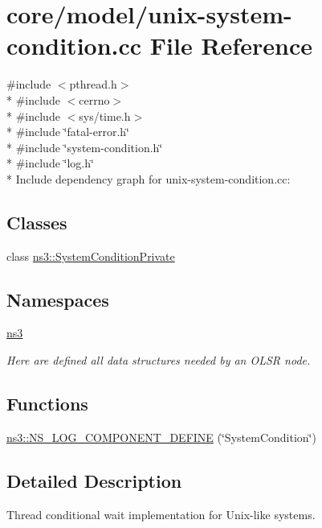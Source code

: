 \hypertarget{unix-system-condition_8cc}{}\section{core/model/unix-\/system-\/condition.cc File Reference}
\label{unix-system-condition_8cc}
{\ttfamily \#include $<$pthread.\+h$>$}\\*
{\ttfamily \#include $<$cerrno$>$}\\*
{\ttfamily \#include $<$sys/time.\+h$>$}\\*
{\ttfamily \#include \char`\"{}fatal-\/error.\+h\char`\"{}}\\*
{\ttfamily \#include \char`\"{}system-\/condition.\+h\char`\"{}}\\*
{\ttfamily \#include \char`\"{}log.\+h\char`\"{}}\\*
Include dependency graph for unix-\/system-\/condition.cc\+:
\subsection*{Classes}
\begin{DoxyCompactItemize}
\item 
class \hyperlink{classns3_1_1SystemConditionPrivate}{ns3\+::\+System\+Condition\+Private}
\end{DoxyCompactItemize}
\subsection*{Namespaces}
\begin{DoxyCompactItemize}
\item 
 \hyperlink{namespacens3}{ns3}
\begin{DoxyCompactList}\small\item\em Here are defined all data structures needed by an O\+L\+SR node. \end{DoxyCompactList}\end{DoxyCompactItemize}
\subsection*{Functions}
\begin{DoxyCompactItemize}
\item 
\hyperlink{namespacens3_a4570572badbd0653a21355f058a39448}{ns3\+::\+N\+S\+\_\+\+L\+O\+G\+\_\+\+C\+O\+M\+P\+O\+N\+E\+N\+T\+\_\+\+D\+E\+F\+I\+NE} (\char`\"{}System\+Condition\char`\"{})
\end{DoxyCompactItemize}


\subsection{Detailed Description}
Thread conditional wait implementation for Unix-\/like systems. 